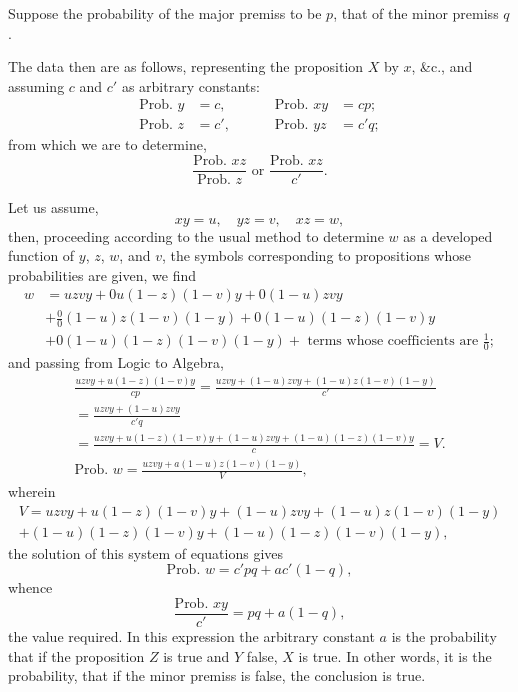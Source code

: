 \documentclass[oneside]{book}
\begin{document}
Suppose the probability of the major premiss to be $p$, that of the
minor premiss $q$.

The data then are as follows, representing the proposition $X$
by $x$, \&c., and assuming $c$ and $c'$ as arbitrary constants:
\begin{align*}
  \text{Prob. }y &= c, \qquad &\text{ Prob. }xy &= cp;\\
  \text{Prob. }z &= c',\qquad &\text{ Prob. }yz &= c'q;
\end{align*}
from which we are to determine,
\[
  \frac{\text{Prob. }xz}{\text{Prob. }z}
  \text{ or }
  \frac{\text{Prob. }xz}{c'}.
\]

Let us assume,
\[
  xy = u,\quad  yz = v,\quad  xz = w,
\]
then, proceeding according to the usual method to determine $w$
as a developed function of $y$, $z$, $w$, and $v$, the symbols corresponding to propositions whose probabilities are given, we find
\[
\begin{split}
  w &= uzvy + 0u(1-z)(1-v)y + 0(1-u)zvy   \\
    &+ \frac{0}{0}(1-u)z(1-v)(1-y) + 0(1-u)(1-z)(1-v)y   \\
    &+ 0(1-u)(1-z)(1-v)(1-y)
     + \text{ terms whose coefficients are }\frac{1}{0};
\end{split}
\]%
and passing from Logic to Algebra,
\begin{multline*}
  \frac{uzvy + u(1-z)(1-v)y}{cp}
= \frac{uzvy + (1-u)zvy + (1-u)z(1-v)(1-y)}{c'}   \\
= \frac{uzvy + (1-u)zvy}{c'q}   \\
= \frac{uzvy + u(1-z)(1-v)y + (1-u)zvy + (1-u)(1-z)(1-v)y}{c} = V. \\
  \text{Prob. }w = \frac{uzvy + a(1-u)z(1-v)(1-y)}{V},
\end{multline*}
wherein
\[
\begin{split}
  V = uzvy + u(1-z)(1-v)y + (1-u)zvy + (1-u)z(1-v)(1-y)   \\
    +(1-u)(1-z)(1-v)y + (1-u)(1-z)(1-v)(1-y),
\end{split}
\]
the solution of this system of equations gives
\[
  \text{Prob. }w = c'pq + ac' (1-q),
\]
whence
\[
  \frac{\text{Prob. } xy}{c'} = pq + a(1-q),
\]
the value required. In this expression the arbitrary constant $a$
is the probability that if the proposition $Z$ is true and $Y$ false, $X$
is true. In other words, it is the probability, that if the minor
premiss is false, the conclusion is true.
\end{document}

